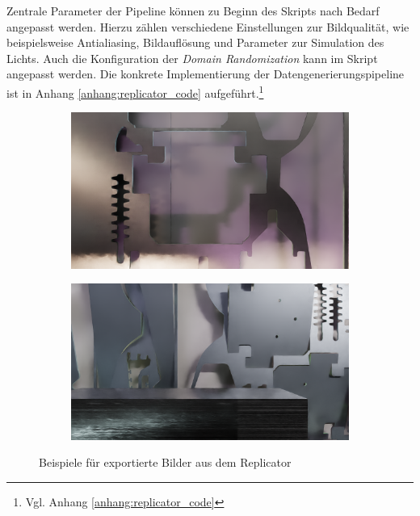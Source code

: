 Zentrale Parameter der Pipeline können zu Beginn des Skripts nach Bedarf angepasst werden. Hierzu zählen verschiedene  Einstellungen zur Bildqualität, wie beispielsweise Antialiasing, Bildauflösung und Parameter zur Simulation des Lichts. Auch die Konfiguration der \textit{Domain Randomization} kann im Skript angepasst werden. Die konkrete Implementierung der Datengenerierungspipeline ist in Anhang \ref{anhang:replicator_code} aufgeführt.\footnote{Vgl. Anhang \ref{anhang:replicator_code}}

\begin{figure}[htb]
    \centering
    \begin{subfigure}{0.49\textwidth}
        \includegraphics[width=\textwidth]{graphics/example_synthetic_images/Beispiel_Replicator_1.png}
    \end{subfigure}
    \hfill
    \begin{subfigure}{0.49\textwidth}
        \includegraphics[width=\textwidth]{graphics/example_synthetic_images/Beispiel_Replicator_2.png}
    \end{subfigure}
    \caption{Beispiele für exportierte Bilder aus dem Replicator}
    \label{fig:beispiel_replicator}
\end{figure}

